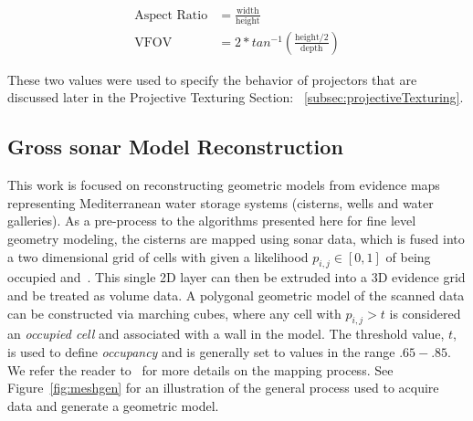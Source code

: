 \documentclass[a4paper,twoside]{article}
\begin{document}
\begin{align}
\text{Aspect Ratio} &= \frac{\text{width}}{\text{height}} \\
\text{VFOV} &= 2 * tan^{-1}(\frac{\text{height}/2}{\text{depth}})
\end{align}


These two values were used to specify the behavior of projectors that are discussed later in the Projective Texturing Section: ~\ref{subsec:projectiveTexturing}.

\subsection{{Gross sonar Model Reconstruction}}
\label{sec:reconstruction}

\begin{figure*}[ht!]
   \vspace{-0.2cm}
   \caption{How we generate meshes from sonar models.}
  \label{fig:meshgen}
 \end{figure*}
 
\noindent This work is focused on reconstructing geometric models from evidence maps representing Mediterranean water storage systems (cisterns, wells and water galleries).  As a pre-process to the algorithms presented here for fine level geometry modeling, the cisterns are mapped using sonar data, which is fused into a two dimensional grid of cells with given a likelihood $p_{i,j} \in [0,1]$ of being occupied \cite{Thrun2005} and~\cite{White10}.  This single 2D layer can then be extruded into a 3D evidence grid and be treated as volume data.  A polygonal geometric model of the scanned data can be constructed via marching cubes, where any cell with $p_{i,j} > t$ is considered an \emph{occupied cell} and associated with a wall in the model.   The threshold value, $t$, is used to define \emph{occupancy} and is generally set to values in the range $.65-.85$. We refer the reader to~\cite{ICEX11,McVicker,McVicker2} for more details on the mapping process.  See Figure~\ref{fig:meshgen} for an illustration of the general process used to acquire data and generate a geometric model.
\end{document}
